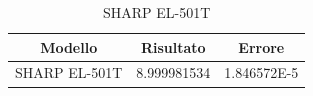 \begin{table}
	\centering
		\begin{tabular}{lll}
		\toprule
		\multicolumn{1}{c}{Modello}&\multicolumn{1}{c}{Risultato}&\multicolumn{1}{c}{Errore}\\
		\midrule
		SHARP EL-501T&\num{8.999981534}&\num{1.846572E-5}\\
		\bottomrule
	\end{tabular} 


	\caption{SHARP EL-501T}
	\label{tab:SHARPEL-501T}
\end{table}
